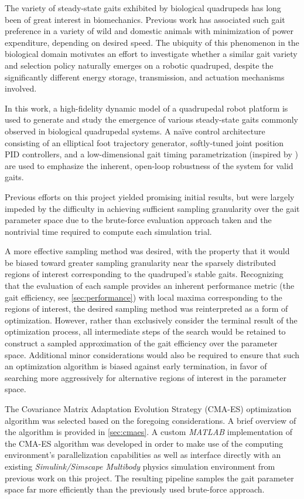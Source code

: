 \documentclass[conference,11pt,letterpaper]{IEEEtran}
\begin{document}
The variety of steady-state gaits exhibited by biological quadrupeds has long been of great interest in biomechanics. Previous work \autocite{hoyt_taylor_1981,hegland_taylor_1988} has associated such gait preference in a variety of wild and domestic animals with minimization of power expenditure, depending on desired speed. The ubiquity of this phenomenon in the biological domain motivates an effort to investigate whether a similar gait variety and selection policy naturally emerges on a robotic quadruped, despite the significantly different energy storage, transmission, and actuation mechanisms involved.

In this work, a high-fidelity dynamic model of a quadrupedal robot platform is used to generate and study the emergence of various steady-state gaits commonly observed in biological quadrupedal systems. A na{\"i}ve control architecture consisting of an elliptical foot trajectory generator, softly-tuned joint position PID controllers, and a low-dimensional gait timing parametrization (inspired by \autocite{Hildebrand701}) are used to emphasize the inherent, open-loop robustness of the system for valid gaits. 

Previous efforts on this project yielded promising initial results, but were largely impeded by the difficulty in achieving sufficient sampling granularity over the gait parameter space due to the brute-force evaluation approach taken and the nontrivial time required to compute each simulation trial. 

A more effective sampling method was desired, with the property that it would be biased toward greater sampling granularity near the sparsely distributed regions of interest corresponding to the quadruped's stable gaits. Recognizing that the evaluation of each sample provides an inherent performance metric (the gait efficiency, see \cref{sec:performance}) with local maxima corresponding to the regions of interest, the desired sampling method was reinterpreted as a form of optimization. However, rather than exclusively consider the terminal result of the optimization process, all intermediate steps of the search would be retained to construct a sampled approximation of the gait efficiency over the parameter space. Additional minor considerations would also be required to ensure that such an optimization algorithm is biased against early termination, in favor of searching more aggressively for alternative regions of interest in the parameter space.

The Covariance Matrix Adaptation Evolution Strategy (CMA-ES) optimization algorithm \autocite{hansen2001} was selected based on the foregoing considerations. A brief overview of the algorithm is provided in \cref{sec:cmaes}. A custom \emph{MATLAB} implementation of the CMA-ES algorithm was developed in order to make use of the computing environment's parallelization capabilities as well as interface directly with an existing \emph{Simulink/Simscape Multibody} physics simulation environment from previous work on this project. The resulting pipeline samples the gait parameter space far more efficiently than the previously used brute-force approach.
\end{document}
